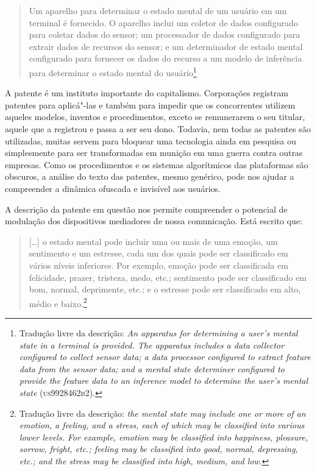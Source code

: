 \begin{quote}
Um aparelho para determinar o estado mental de um usuário em um terminal
é fornecido. O aparelho inclui um coletor de dados configurado para
coletar dados do sensor; um processador de dados configurado para
extrair dados de recursos do sensor; e um determinador de estado mental
configurado para fornecer os dados do recurso a um modelo de inferência
para determinar o estado mental do usuário\footnote{Tradução livre da descrição: \emph{An apparatus for
  determining a user's mental state in a terminal is provided. The
  apparatus includes a data collector configured to collect sensor data;
  a data processor configured to extract feature data from the sensor
  data; and a mental state determiner configured to provide the feature
  data to an inference model to determine the user's mental state}
  (\textsc{us9928462b2}).}
\end{quote}

A patente é um instituto importante do capitalismo. Corporações
registram patentes para aplicá"-las e também para impedir que os
concorrentes utilizem aqueles modelos, inventos e procedimentos, exceto
se remunerarem o seu titular, aquele que a registrou e passa a ser seu
dono. Todavia, nem todas as patentes são utilizadas, muitas servem para
bloquear uma tecnologia ainda em pesquisa ou simplesmente para ser
transformadas em munição em uma guerra contra outras empresas. Como os
procedimentos e os sistemas algorítmicos das plataformas são obscuros, a
análise do texto das patentes, mesmo genérico, pode nos ajudar a
compreender a dinâmica ofuscada e invisível aos usuários.

A descrição da patente em questão nos permite compreender o potencial de
modulação dos dispositivos mediadores de nossa comunicação. Está escrito
que:

\begin{quote}
{[}\ldots{}{]} o estado mental pode incluir uma ou mais de uma emoção, um
sentimento e um estresse, cada um dos quais pode ser classificado em
vários níveis inferiores. Por exemplo, emoção pode ser classificada em
felicidade, prazer, tristeza, medo, etc.; sentimento pode ser
classificado em bom, normal, deprimente, etc.; e o estresse pode ser
classificado em alto, médio e baixo.\footnote{Tradução livre da
  descrição: \emph{the mental state may include one or more of an emotion, a
    feeling, and a stress, each of which may be classified into various
    lower levels. For example, emotion may be classified into happiness,
    pleasure, sorrow, fright, etc.; feeling may be classified into good,
    normal, depressing, etc.; and the stress may be classified into high,
    medium, and low}.}
\end{quote}

